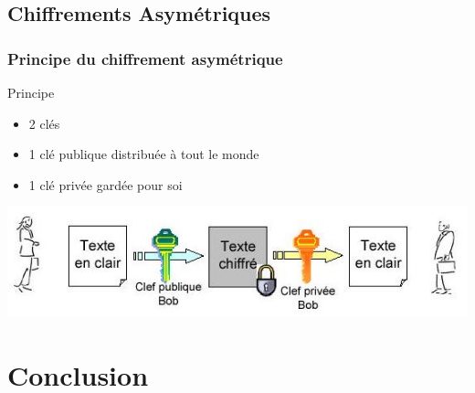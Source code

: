 \documentclass[xcolor={dvipsnames}]{beamer}
\begin{document}
\subsection{Chiffrements Asymétriques}

\begin{frame}
	\frametitle{Principe du chiffrement asymétrique}
	
	\begin{block}{Principe}
	
		\begin{itemize}
			\item 2 clés
			\item 1 clé publique distribuée à tout le monde
			\item 1 clé privée gardée pour soi
		\end{itemize}
	\end{block}
	
	\begin{center}
		\includegraphics[scale=0.5]{asym}
	\end{center}	
	
\end{frame}

\section{Conclusion}


\end{document}
